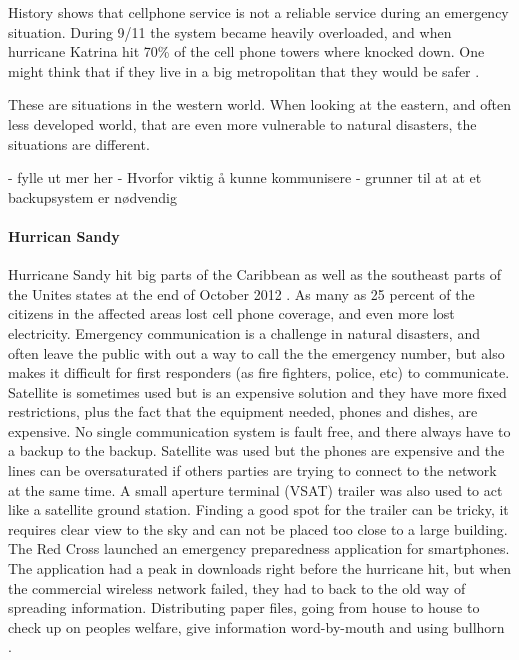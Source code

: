 

History shows that cellphone service is not a reliable service during an emergency situation. During 9/11 the system became heavily overloaded, and when hurricane Katrina hit 70\% of the cell phone towers where knocked down. One might think that if they live in a big metropolitan that they would be safer \cite{disasterComm}. 

These are situations in the western world. When looking at the eastern, and often less developed world, that are even more vulnerable to natural disasters, the situations are different. 

- fylle ut mer her
- Hvorfor viktig å kunne kommunisere 
- grunner til at at et backupsystem er nødvendig



\paragraph{Hurrican Sandy}
Hurricane Sandy hit big parts of the Caribbean as well as the southeast parts of the Unites states at the end of October 2012 \cite{WikiSandy}. As many as 25 percent of the citizens in the affected areas lost cell phone coverage, and even more lost electricity. Emergency communication is a challenge in natural disasters, and often leave the public with out a way to call the the emergency number, but also makes it difficult for first responders (as fire fighters, police, etc) to communicate.  Satellite is sometimes used but is an expensive solution and they have more fixed restrictions, plus the fact that the equipment needed, phones and dishes, are expensive. No single communication system is fault free, and there always have to a backup to the backup. Satellite was used but the phones are expensive and the lines can be oversaturated if others parties are trying to connect to the network at the same time. A small aperture terminal (VSAT) trailer was also used to act like a satellite ground station. Finding a good spot for the trailer can be tricky, it requires clear view to the sky and can not be placed too close to a large building. The Red Cross launched an emergency preparedness application for smartphones. The application had a peak in downloads right before the hurricane hit, but when the commercial wireless network failed, they had to back to the old way of spreading information. Distributing paper files, going from house to house to check up on peoples welfare, give information word-by-mouth and using bullhorn \cite{hurricaneSandy}.

